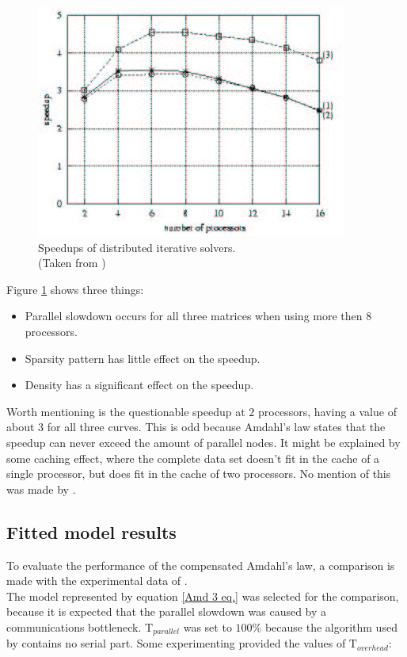 \begin{figure}[h!]
    \includegraphics[width=0.5\linewidth]{figures/Amd_scale.png}
    \centering
    \caption{Speedups of distributed iterative solvers.\\ (Taken from \citeauthor{dist_it_solv})}
    \label{com. amd. sc.}
\end{figure}

\noindent Figure \ref{com. amd. sc.} shows three things:

\begin{itemize}
    \item Parallel slowdown occurs for all three matrices when using more then $8$ processors.
    \item Sparsity pattern has little effect on the speedup.
    \item Density has a significant effect on the speedup.
\end{itemize}

Worth mentioning is the questionable speedup at $2$ processors, having a value of about $3$ for all three curves. This is odd because Amdahl's law states that the speedup can never exceed the amount of parallel nodes. It might be explained by some caching effect, where the complete data set doesn't fit in the cache of a single processor, but does fit in the cache of two processors. No mention of this was made by \citeauthor{dist_it_solv}.\\

\subsection{Fitted model results}

\hspace{4mm} To evaluate the performance of the compensated Amdahl's law, a comparison is made with the experimental data of \citeauthor{dist_it_solv}.\\

The model represented by equation \ref{Amd 3 eq.} was selected for the comparison, because it is expected that the parallel slowdown was caused by a communications bottleneck. $\text{T}_{parallel}$ was set to $100 \%$ because the algorithm used by \citeauthor{dist_it_solv} contains no serial part. Some experimenting provided the values of $\text{T}_{overhead}$:

